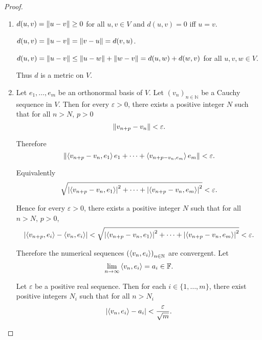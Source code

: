 \begin{proof}
    \begin{enumerate}[label={(\alph*)}]
        \item $d(u, v) = \left\Vert{u - v}\right\Vert\geq 0$ for all $u, v\in V$ and $d(u, v) = 0$ iff $u = v$.

              $d(u, v) = \left\Vert{u - v}\right\Vert = \left\Vert{v - u}\right\Vert = d(v, u)$.

              $d(u, v) = \left\Vert{u - v}\right\Vert\leq \left\Vert{u - w}\right\Vert + \left\Vert{w - v}\right\Vert = d(u, w) + d(w, v)$ for all $u, v, w\in V$.

              Thus $d$ is a metric on $V$.
        \item Let $e_{1}, \ldots, e_{m}$ be an orthonormal basis of $V$. Let ${(v_{n})}_{n\in\mathbb{N}}$ be a Cauchy sequence in $V$. Then for every $\varepsilon > 0$, there exists a positive integer $N$ such that for all $n > N$, $p > 0$
              \[
                  \left\Vert{v_{n+p} - v_{n}}\right\Vert < \varepsilon.
              \]

              Therefore
              \[
                  \left\Vert{\left\langle{v_{n+p} - v_{n}, e_{1}}\right\rangle e_{1} + \cdots + \left\langle{v_{n+p - v_{n}, e_{m}}}\right\rangle e_{m}}\right\Vert < \varepsilon.
              \]

              Equivalently
              \[
                  \sqrt{\left\vert{\left\langle{v_{n+p} - v_{n}, e_{1}}\right\rangle}\right\vert^{2} + \cdots + \left\vert{\left\langle{v_{n+p} - v_{n}, e_{m}}\right\rangle}\right\vert^{2}} < \varepsilon.
              \]

              Hence for every $\varepsilon > 0$, there exists a positive integer $N$ such that for all $n > N$, $p > 0$,
              \[
                  \left\vert{ \left\langle{v_{n+p}, e_{i}}\right\rangle - \left\langle{v_{n}, e_{i}}\right\rangle }\right\vert < \sqrt{\left\vert{\left\langle{v_{n+p} - v_{n}, e_{1}}\right\rangle}\right\vert^{2} + \cdots + \left\vert{\left\langle{v_{n+p} - v_{n}, e_{m}}\right\rangle}\right\vert^{2}} < \varepsilon.
              \]

              Therefore the numerical sequences ${(\left\langle{v_{n}, e_{i}}\right\rangle)}_{n\in\mathbb{N}}$ are convergent. Let
              \[
                  \lim\limits_{n\to\infty}\left\langle{v_{n}, e_{i}}\right\rangle = a_{i} \in \mathbb{F}.
              \]

              Let $\varepsilon$ be a positive real sequence. Then for each $i\in\{ 1,\ldots, m \}$, there exist positive integers $N_{i}$  such that for all $n > N_{i}$
              \[
                  \left\vert{\left\langle{v_{n}, e_{i}}\right\rangle - a_{i}}\right\vert < \frac{\varepsilon}{\sqrt{m}}.
              \]


\end{enumerate}
\end{proof}
